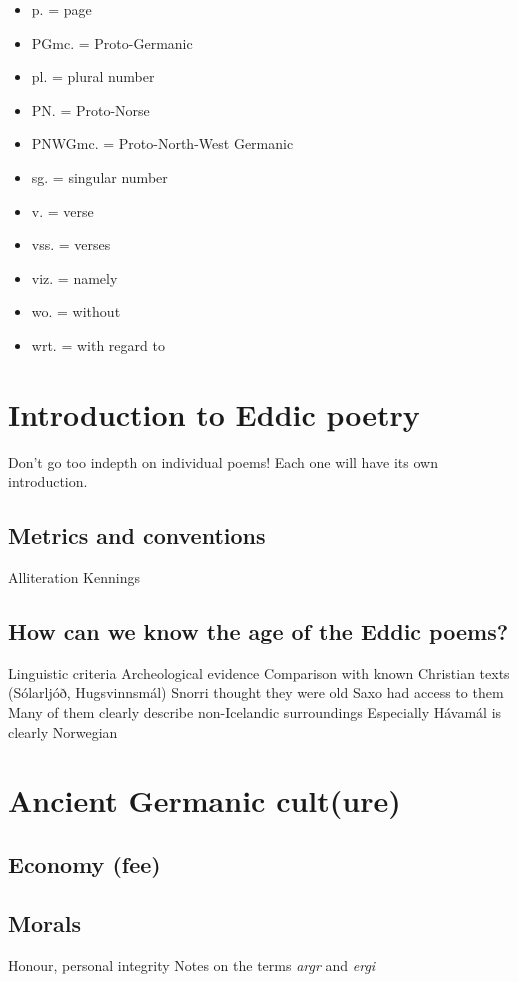 \begin{itemize}
    \item p. = page
    \item PGmc. = Proto-Germanic
    \item pl. = plural number
    \item PN. = Proto-Norse
    \item PNWGmc. = Proto-North-West Germanic
    \item sg. = singular number
    \item v. = verse
    \item vss. = verses
    \item viz. = namely
    \item wo. = without
    \item wrt. = with regard to
  \end{itemize}

\newpage


\section{Introduction to Eddic poetry}
  Don't go too indepth on individual poems! Each one will have its own introduction.
  \subsection{Metrics and conventions}
    Alliteration
    Kennings
  \subsection{How can we know the age of the Eddic poems?}
    Linguistic criteria
    Archeological evidence
    Comparison with known Christian texts (Sólarljóð, Hugsvinnsmál)
    Snorri thought they were old
    Saxo had access to them
    Many of them clearly describe non-Icelandic surroundings
      Especially Hávamál is clearly Norwegian

\section{Ancient Germanic cult(ure)}
  \subsection{Economy (fee)}
  \subsection{Morals}
    Honour, personal integrity
    Notes on the terms \emph{argr} and \emph{ergi}
